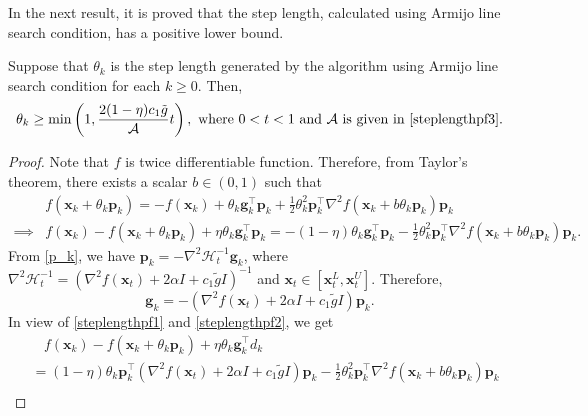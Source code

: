 \documentclass{elsarticle}
\numberwithin{equation}{section}
\begin{document}
{In the next result, it is proved that the step length, calculated using Armijo line search condition, has a positive lower bound.

\begin{lemma}\label{steplengthlemma}
    Suppose that $\theta_{k}$ is the step length generated by the algorithm using Armijo line search condition for each $k\geq0$. Then,  
    \begin{equation*}
    \theta_{k}\geq \min\left(1,\frac{2(1-\eta)c_1\tilde{g}}{\mathcal{A}}{t}\right),  \text{ where } 0<t<1 \text{ and } \mathcal{A} \text{ is given in }\eqref{steplengthpf3}.      
    \end{equation*}
\end{lemma}
\begin{proof}
    Note that $f$ is twice differentiable function. Therefore, from Taylor's theorem, there exists a scalar $b\in (0,1)$ such that 
    \begin{align}\label{steplengthpf1}
    &f(\mathbf{x}_{k}+\theta_{k}\mathbf{p}_k)=-f(\mathbf{x}_{k})+\theta_{k}\mathbf{g}^{\top}_{k}\mathbf{p}_{k}+\frac{1}{2} \theta^{2}_{k}\mathbf{p}^{\top}_{k} \nabla^{2} f(\mathbf{x}_{k}+b\theta_{k}\mathbf{p}_{k})\mathbf{p}_{k}\nonumber\\
    \implies& f(\mathbf{x}_{k})-f(\mathbf{x}_{k}+\theta_{k}\mathbf{p}_{k})+\eta\theta_{k}\mathbf{g}^{\top}_{k}\mathbf{p}_{k}=-(1-\eta)\theta_{k}\mathbf{g}^{\top}_{k}\mathbf{p}_{k}-\frac{1}{2} \theta^{2}_{k}\mathbf{p}^{\top}_{k}\nabla^{2}f(\mathbf{x}_{k}+b\theta_{k}\mathbf{p}_{k})\mathbf{p}_{k}.
    \end{align}
    From \eqref{p_k}, we have $\mathbf{p}_{k}=-\nabla^{2}\mathcal{H}^{-1}_{t}\mathbf{g}_k$, where  $\nabla^{2}\mathcal{H}^{-1}_{t}=(\nabla^{2} f(\mathbf{x}_{t})+2\alpha I+c_1\tilde g I)^{-1}$ and $\mathbf{x}_{t}\in
    [\mathbf{x}^{L}_{t}, \mathbf{x}^{U}_{t}]$. Therefore,
    \begin{equation}\label{steplengthpf2}
    \mathbf{g}_k=-(\nabla^{2} f(\mathbf{x}_{t})+2\alpha I+c_1\tilde g I)\mathbf{p}_{k}.
    \end{equation}
    In view of \eqref{steplengthpf1} and \eqref{steplengthpf2}, we get 
    \begin{align}\label{steplengthpf4}
        &~~~~f(\mathbf{x}_{k})-f(\mathbf{x}_{k}+\theta_{k}\mathbf{p}_{k})+\eta\theta_{k}\mathbf{g}^{\top}_{k}d_{k}\nonumber\\
        &= (1-\eta) \theta_{k} \mathbf{p}^{\top}_{k} (\nabla^{2} f(\mathbf{x}_{t})+2\alpha I+c_1\tilde g I)\mathbf{p}_{k}-\frac{1}{2} \theta^{2}_{k} \mathbf{p}^{\top}_{k}\nabla^{2} f(\mathbf{x}_{k}+b\theta_{k}\mathbf{p}_{k})\mathbf{p}_k\nonumber\\

\end{align}
\end{proof}}
\end{document}
